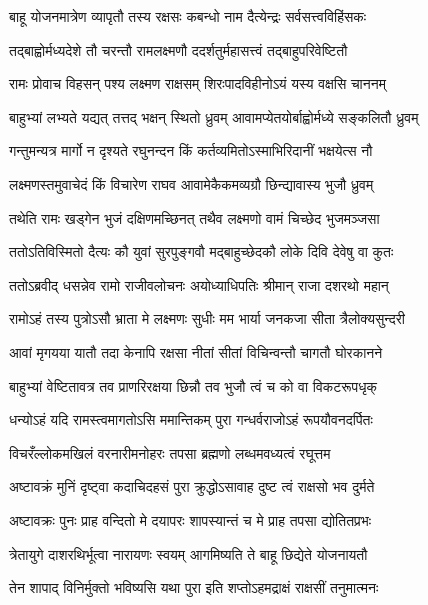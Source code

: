 \twolineshloka
{बाहू योजनमात्रेण व्यापृतौ तस्य रक्षसः}
{कबन्धो नाम दैत्येन्द्रः सर्वसत्त्वविहिंसकः} %

\twolineshloka
{तद्बाह्वोर्मध्यदेशे तौ चरन्तौ रामलक्ष्मणौ}
{ददर्शतुर्महासत्त्वं तद्बाहुपरिवेष्टितौ} %

\twolineshloka
{रामः प्रोवाच विहसन् पश्य लक्ष्मण राक्षसम्}
{शिरःपादविहीनोऽयं यस्य वक्षसि चाननम्} %

\twolineshloka
{बाहुभ्यां लभ्यते यद्यत् तत्तद् भक्षन् स्थितो ध्रुवम्}
{आवामप्येतयोर्बाह्वोर्मध्ये सङ्कलितौ ध्रुवम्} %

\twolineshloka
{गन्तुमन्यत्र मार्गो न दृश्यते रघुनन्दन}
{किं कर्तव्यमितोऽस्माभिरिदानीं भक्षयेत्स नौ} %

\twolineshloka
{लक्ष्मणस्तमुवाचेदं किं विचारेण राघव}
{आवामेकैकमव्यग्रौ छिन्द्यावास्य भुजौ ध्रुवम्} %

\twolineshloka
{तथेति रामः खड्गेन भुजं दक्षिणमच्छिनत्}
{तथैव लक्ष्मणो वामं चिच्छेद भुजमञ्जसा} %

\twolineshloka
{ततोऽतिविस्मितो दैत्यः कौ युवां सुरपुङ्गवौ}
{मद्बाहुच्छेदकौ लोके दिवि देवेषु वा कुतः} %

\twolineshloka
{ततोऽब्रवीद् धसन्नेव रामो राजीवलोचनः}
{अयोध्याधिपतिः श्रीमान् राजा दशरथो महान्} %

\twolineshloka
{रामोऽहं तस्य पुत्रोऽसौ भ्राता मे लक्ष्मणः सुधीः}
{मम भार्या जनकजा सीता त्रैलोक्यसुन्दरी} %

\twolineshloka
{आवां मृगयया यातौ तदा केनापि रक्षसा}
{नीतां सीतां विचिन्वन्तौ चागतौ घोरकानने} %

\twolineshloka
{बाहुभ्यां वेष्टितावत्र तव प्राणरिरक्षया}
{छिन्नौ तव भुजौ त्वं च को वा विकटरूपधृक्} %


\twolineshloka
{धन्योऽहं यदि रामस्त्वमागतोऽसि ममान्तिकम्}
{पुरा गन्धर्वराजोऽहं रूपयौवनदर्पितः} %

\twolineshloka
{विचरँल्लोकमखिलं वरनारीमनोहरः}
{तपसा ब्रह्मणो लब्धमवध्यत्वं रघूत्तम} %

\twolineshloka
{अष्टावक्रं मुनिं दृष्ट्वा कदाचिदहसं पुरा}
{क्रुद्धोऽसावाह दुष्ट त्वं राक्षसो भव दुर्मते} %

\twolineshloka
{अष्टावक्रः पुनः प्राह वन्दितो मे दयापरः}
{शापस्यान्तं च मे प्राह तपसा द्योतितप्रभः} %

\twolineshloka
{त्रेतायुगे दाशरथिर्भूत्वा नारायणः स्वयम्}
{आगमिष्यति ते बाहू छिद्येते योजनायतौ} %

\twolineshloka
{तेन शापाद् विनिर्मुक्तो भविष्यसि यथा पुरा}
{इति शप्तोऽहमद्राक्षं राक्षसीं तनुमात्मनः} %

